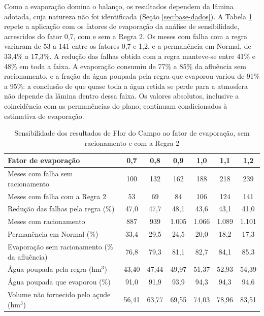 Como a evaporação domina o balanço, os resultados dependem da lâmina adotada, cuja natureza não foi identificada (Seção \ref{sec:base-dados}). A Tabela \ref{tab:flor-evap-regra} repete a aplicação com os fatores de evaporação da análise de sensibilidade, acrescidos do fator 0,7, com e sem a Regra 2. Os meses com falha com a regra variaram de 53 a 141 entre os fatores 0,7 e 1,2, e a permanência em Normal, de 33,4\% a 17,3\%. A redução das falhas obtida com a regra manteve-se entre 41\% e 48\% em toda a faixa. A evaporação consumiu de 77\% a 85\% da afluência sem racionamento, e a fração da água poupada pela regra que evaporou variou de 91\% a 95\%: a conclusão de que quase toda a água retida se perde para a atmosfera não depende da lâmina dentro dessa faixa. Os valores absolutos, inclusive a coincidência com as permanências do plano, continuam condicionados à estimativa de evaporação.

\begin{table}[H]
    \captionsetup{width=15cm}
    \caption{Sensibilidade dos resultados de Flor do Campo ao fator de evaporação, sem racionamento e com a Regra 2}
    \label{tab:flor-evap-regra}
    \centering
    \small
    \begin{tabular}{lcccccc}
        \toprule
        Fator de evaporação & 0,7 & 0,8 & 0,9 & 1,0 & 1,1 & 1,2 \\
        \midrule
        Meses com falha sem racionamento & 100 & 132 & 162 & 188 & 218 & 239 \\
        Meses com falha com a Regra 2 & 53 & 69 & 84 & 106 & 124 & 141 \\
        Redução das falhas pela regra (\%) & 47,0 & 47,7 & 48,1 & 43,6 & 43,1 & 41,0 \\
        Meses com racionamento & 887 & 939 & 1.005 & 1.066 & 1.089 & 1.101 \\
        Permanência em Normal (\%) & 33,4 & 29,5 & 24,5 & 20,0 & 18,2 & 17,3 \\
        Evaporação sem racionamento (\% da afluência) & 76,8 & 79,3 & 81,1 & 82,7 & 84,1 & 85,3 \\
        Água poupada pela regra (hm$^3$) & 43,40 & 47,44 & 49,97 & 51,37 & 52,93 & 54,39 \\
        Água poupada que evaporou (\%) & 91,0 & 91,9 & 93,9 & 94,3 & 94,3 & 94,6 \\
        Volume não fornecido pelo açude (hm$^3$) & 56,41 & 63,77 & 69,55 & 74,03 & 78,96 & 83,51 \\
        \bottomrule
    \end{tabular}
\end{table}

